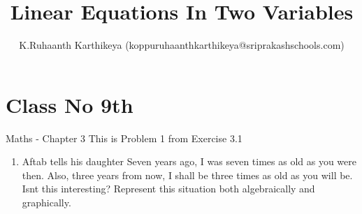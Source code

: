 \documentclass[12pt]{article}
\title{Linear Equations In Two Variables}
\author{K.Ruhaanth Karthikeya (koppuruhaanthkarthikeya@sriprakashschools.com)}
\begin{document}
\maketitle
\section*{Class No 9th} { Maths - Chapter 3}
This is Problem 1 from Exercise 3.1
\begin{enumerate}
\item Aftab tells his daughter Seven years ago,
I was seven times as old as you were then. Also, three years from 
now, I shall be three times as old as you will be. Isnt this interesting?
 Represent this situation both algebraically and graphically.



	

\end{enumerate}
\end{document}
